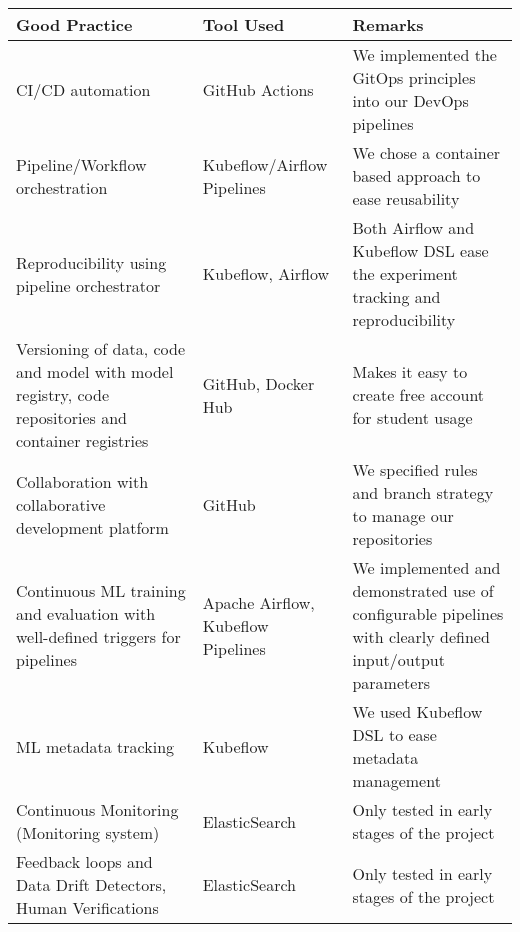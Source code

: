 \footnotesize
\begin{longtable}{|p{5cm}|p{4cm}|p{8cm}|}
    \hline
    \textbf{Good Practice} & \textbf{Tool Used} & \textbf{Remarks}\\
    \hline
    CI/CD automation & GitHub Actions & We implemented the GitOps principles into our DevOps pipelines \\
    \hline
    Pipeline/Workflow orchestration & Kubeflow/Airflow Pipelines & We chose a container based approach to ease reusability \\
    \hline
    Reproducibility using pipeline orchestrator & Kubeflow, Airflow &  Both Airflow and Kubeflow DSL ease the experiment tracking and reproducibility \\
    \hline
    Versioning of data, code and model with model registry, code repositories and container registries & GitHub, Docker Hub & Makes it easy to create free account for student usage\\
    \hline
    Collaboration with collaborative development platform & GitHub & We specified rules and branch strategy to manage our repositories \\
    \hline
    Continuous ML training and evaluation with well-defined triggers for pipelines & Apache Airflow, Kubeflow Pipelines & We implemented and demonstrated use of configurable pipelines with clearly defined input/output parameters\\
    \hline
    ML metadata tracking & Kubeflow & We used Kubeflow DSL to ease metadata management\\
    \hline
    Continuous Monitoring (Monitoring system) & ElasticSearch & Only tested in early stages of the project\\
    \hline
    Feedback loops and Data Drift Detectors, Human Verifications & ElasticSearch & Only tested in early stages of the project\\
    \hline
\end{longtable}
\normalsize

